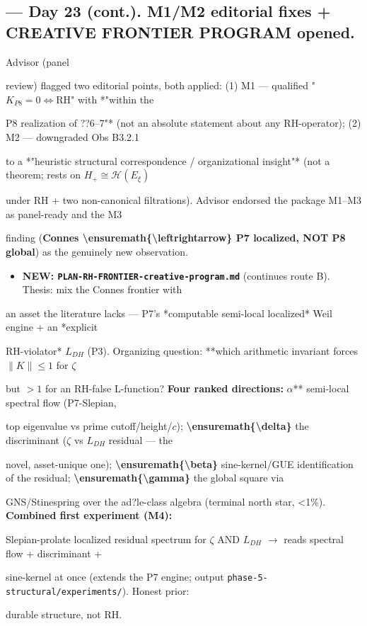 \documentclass[10pt]{article}
\begin{document}
\subsection*{ --- Day 23 (cont.). M1/M2 editorial fixes + CREATIVE FRONTIER PROGRAM opened.}
Advisor (panel\par
review) flagged two editorial points, both applied: (1) M1 --- qualified "$K_{P8}=0\iff$RH" with *"within the\par
P8 realization of ??6--7"* (not an absolute statement about any RH-operator); (2) M2 --- downgraded Obs B3.2.1\par
to a *"heuristic structural correspondence / organizational insight"* (not a theorem; rests on $H_+\cong\mathcal H(E_\xi)$\par
under RH + two non-canonical filtrations). Advisor endorsed the package M1--M3 as panel-ready and the M3\par
finding (\textbf{Connes \textbackslash{}ensuremath\{\textbackslash{}leftrightarrow\} P7 localized, NOT P8 global}) as the genuinely new observation.\par
\begin{itemize}
\item \textbf{NEW: \texttt{PLAN-RH-FRONTIER-creative-program.md}} (continues route B). Thesis: mix the Connes frontier with
\end{itemize}
  an asset the literature lacks --- P7's *computable semi-local localized* Weil engine + an *explicit\par
  RH-violator* $L_{DH}$ (P3). Organizing question: **which arithmetic invariant forces $\|K\|\le1$ for $\zeta$\par
  but $>1$ for an RH-false L-function?\textbf{ Four ranked directions: }\ensuremath{\alpha}** semi-local spectral flow (P7-Slepian,\par
  top eigenvalue vs prime cutoff/height/$c$); \textbf{\textbackslash{}ensuremath\{\textbackslash{}delta\}} the discriminant ($\zeta$ vs $L_{DH}$ residual --- the\par
  novel, asset-unique one); \textbf{\textbackslash{}ensuremath\{\textbackslash{}beta\}} sine-kernel/GUE identification of the residual; \textbf{\textbackslash{}ensuremath\{\textbackslash{}gamma\}} the global square via\par
  GNS/Stinespring over the ad?le-class algebra (terminal north star, <1\%). \textbf{Combined first experiment (M4):}\par
  Slepian-prolate localized residual spectrum for $\zeta$ AND $L_{DH}$ \ensuremath{\to} reads spectral flow + discriminant +\par
  sine-kernel at once (extends the P7 engine; output \texttt{phase-5-structural/experiments/}). Honest prior:\par
  durable structure, not RH.\par
\end{document}

